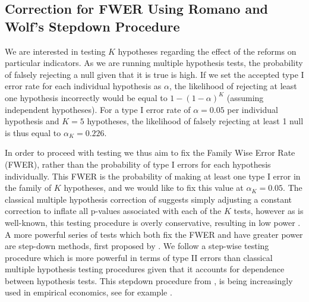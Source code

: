 \documentclass[a4paper,11pt]{article}
\begin{document}
\begin{spacing}{1}
%
%


\clearpage
\section{Correction for FWER Using Romano and Wolf's Stepdown Procedure}
\label{app:RomanoWolf}
We are interested in testing $K$ hypotheses regarding the effect of the
reforms on particular indicators.  As we are running multiple hypothesis
tests, the probability of falsely rejecting a null given that it is true
is high.  If we set the accepted type I error rate for each individual
hypothesis as $\alpha$, the likelihood of rejecting at least one
hypothesis incorrectly would be equal to $1-(1-\alpha)^K$ (assuming
independent hypotheses). For a type I error rate of $\alpha=0.05$ per
individual hypothesis and $K=5$ hypotheses, the likelihood of falsely
rejecting at least 1 null is thus equal to $\alpha_K=0.226$.

In order to proceed with testing we thus aim to fix the Family Wise Error
Rate (FWER), rather than the probability of type I errors for each
hypothesis individually.  This FWER is the probability of making at least
one type I error in the family of $K$ hypotheses, and we would like to fix
this value at $\alpha_K=0.05$.  The classical multiple hypothesis correction
of \citet{Bonferroni1935} suggests simply adjusting a constant correction
to inflate all p-values associated with each of the $K$ tests, however as
is well-known, this testing procedure is overly conservative, resulting
in low power \citep{RomanoWolf2005b}.  A more powerful series of tests
which both fix the FWER and have greater power are step-down methods, first
proposed by \citet{Holm1979}.  We follow a step-wise testing procedure
which is more powerful in terms of type II errors than classical multiple
hypothesis testing procedures given that it accounts for dependence between
hypothesis tests.  This stepdown procedure from \citet{RomanoWolf2005}, is
being increasingly used in empirical economics, see for example
\citet{SavelyevTan2015}.


\end{spacing}
\end{document}

